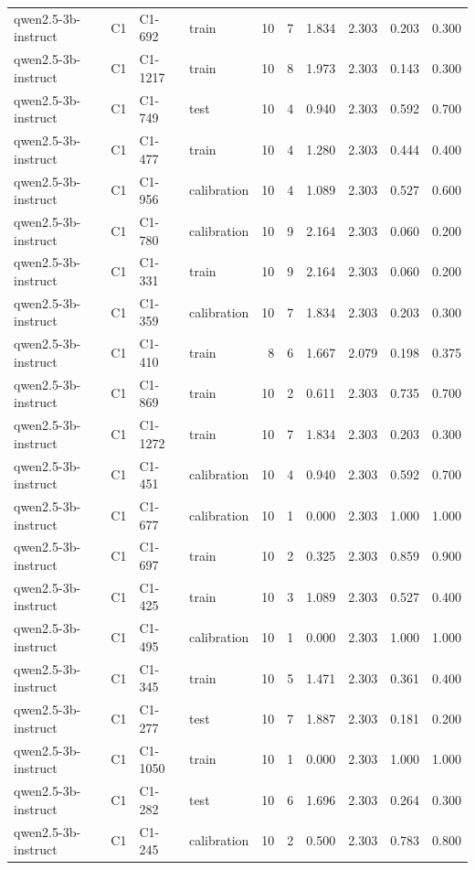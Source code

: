 \begin{table}
\begin{tabular}{llllrrrrrr}
qwen2.5-3b-instruct & C1 & C1-692 & train & 10 & 7 & 1.834 & 2.303 & 0.203 & 0.300 \\
qwen2.5-3b-instruct & C1 & C1-1217 & train & 10 & 8 & 1.973 & 2.303 & 0.143 & 0.300 \\
qwen2.5-3b-instruct & C1 & C1-749 & test & 10 & 4 & 0.940 & 2.303 & 0.592 & 0.700 \\
qwen2.5-3b-instruct & C1 & C1-477 & train & 10 & 4 & 1.280 & 2.303 & 0.444 & 0.400 \\
qwen2.5-3b-instruct & C1 & C1-956 & calibration & 10 & 4 & 1.089 & 2.303 & 0.527 & 0.600 \\
qwen2.5-3b-instruct & C1 & C1-780 & calibration & 10 & 9 & 2.164 & 2.303 & 0.060 & 0.200 \\
qwen2.5-3b-instruct & C1 & C1-331 & train & 10 & 9 & 2.164 & 2.303 & 0.060 & 0.200 \\
qwen2.5-3b-instruct & C1 & C1-359 & calibration & 10 & 7 & 1.834 & 2.303 & 0.203 & 0.300 \\
qwen2.5-3b-instruct & C1 & C1-410 & train & 8 & 6 & 1.667 & 2.079 & 0.198 & 0.375 \\
qwen2.5-3b-instruct & C1 & C1-869 & train & 10 & 2 & 0.611 & 2.303 & 0.735 & 0.700 \\
qwen2.5-3b-instruct & C1 & C1-1272 & train & 10 & 7 & 1.834 & 2.303 & 0.203 & 0.300 \\
qwen2.5-3b-instruct & C1 & C1-451 & calibration & 10 & 4 & 0.940 & 2.303 & 0.592 & 0.700 \\
qwen2.5-3b-instruct & C1 & C1-677 & calibration & 10 & 1 & 0.000 & 2.303 & 1.000 & 1.000 \\
qwen2.5-3b-instruct & C1 & C1-697 & train & 10 & 2 & 0.325 & 2.303 & 0.859 & 0.900 \\
qwen2.5-3b-instruct & C1 & C1-425 & train & 10 & 3 & 1.089 & 2.303 & 0.527 & 0.400 \\
qwen2.5-3b-instruct & C1 & C1-495 & calibration & 10 & 1 & 0.000 & 2.303 & 1.000 & 1.000 \\
qwen2.5-3b-instruct & C1 & C1-345 & train & 10 & 5 & 1.471 & 2.303 & 0.361 & 0.400 \\
qwen2.5-3b-instruct & C1 & C1-277 & test & 10 & 7 & 1.887 & 2.303 & 0.181 & 0.200 \\
qwen2.5-3b-instruct & C1 & C1-1050 & train & 10 & 1 & 0.000 & 2.303 & 1.000 & 1.000 \\
qwen2.5-3b-instruct & C1 & C1-282 & test & 10 & 6 & 1.696 & 2.303 & 0.264 & 0.300 \\
qwen2.5-3b-instruct & C1 & C1-245 & calibration & 10 & 2 & 0.500 & 2.303 & 0.783 & 0.800 \\

\end{tabular}
\end{table}
